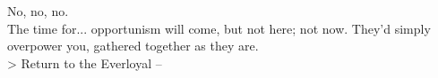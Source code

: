 No, no, no.\\

The time for... opportunism will come, but not here; not now. They’d simply overpower you, gathered together as they are.\\

> Return to the Everloyal -- 